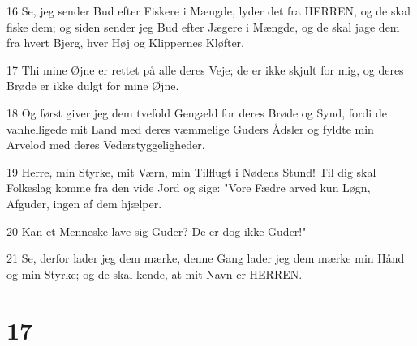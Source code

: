 \par 16 Se, jeg sender Bud efter Fiskere i Mængde, lyder det fra HERREN, og de skal fiske dem; og siden sender jeg Bud efter Jægere i Mængde, og de skal jage dem fra hvert Bjerg, hver Høj og Klippernes Kløfter.
\par 17 Thi mine Øjne er rettet på alle deres Veje; de er ikke skjult for mig, og deres Brøde er ikke dulgt for mine Øjne.
\par 18 Og først giver jeg dem tvefold Gengæld for deres Brøde og Synd, fordi de vanhelligede mit Land med deres væmmelige Guders Ådsler og fyldte min Arvelod med deres Vederstyggeligheder.
\par 19 Herre, min Styrke, mit Værn, min Tilflugt i Nødens Stund! Til dig skal Folkeslag komme fra den vide Jord og sige: "Vore Fædre arved kun Løgn, Afguder, ingen af dem hjælper.
\par 20 Kan et Menneske lave sig Guder? De er dog ikke Guder!"
\par 21 Se, derfor lader jeg dem mærke, denne Gang lader jeg dem mærke min Hånd og min Styrke; og de skal kende, at mit Navn er HERREN.

\chapter{17}

